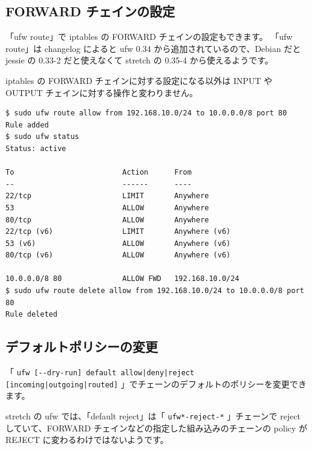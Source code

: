 \documentclass[mingoth,a4paper]{jsarticle}
\begin{document}
\subsection{FORWARD チェインの設定}

「ufw route」で iptables の FORWARD チェインの設定もできます。
「ufw route」は changelog によると ufw 0.34 から追加されているので、Debian だと jessie の 0.33-2 だと使えなくて stretch の 0.35-4 から使えるようです。

iptables の FORWARD チェインに対する設定になる以外は INPUT や OUTPUT チェインに対する操作と変わりません。

\begin{verbatim}
$ sudo ufw route allow from 192.168.10.0/24 to 10.0.0.0/8 port 80
Rule added
$ sudo ufw status
Status: active

To                         Action      From
--                         ------      ----
22/tcp                     LIMIT       Anywhere
53                         ALLOW       Anywhere
80/tcp                     ALLOW       Anywhere
22/tcp (v6)                LIMIT       Anywhere (v6)
53 (v6)                    ALLOW       Anywhere (v6)
80/tcp (v6)                ALLOW       Anywhere (v6)

10.0.0.0/8 80              ALLOW FWD   192.168.10.0/24
$ sudo ufw route delete allow from 192.168.10.0/24 to 10.0.0.0/8 port 80
Rule deleted
\end{verbatim}

\subsection{デフォルトポリシーの変更}

「 \verb~ufw [--dry-run] default allow|deny|reject [incoming|outgoing|routed]~ 」でチェーンのデフォルトのポリシーを変更できます。

stretch の ufw では、「default reject」は「 \verb~ufw*-reject-*~ 」チェーンで reject していて、FORWARD チェインなどの指定した組み込みのチェーンの policy が REJECT に変わるわけではないようです。
\end{document}
